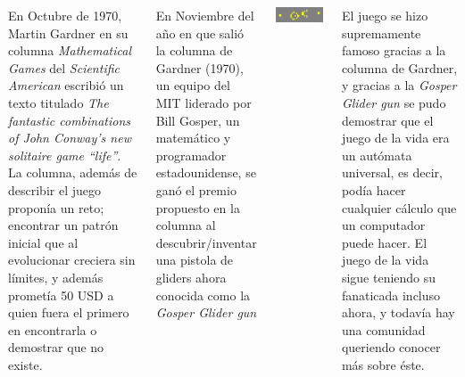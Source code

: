 \documentclass[20pt,margin=2.2cm,innermargin=-4.5in,blockverticalspace=-0.25in]{tikzposter}
\begin{document}
\begin{columns}
{        \vspace{5mm}
        En Octubre de 1970, Martin Gardner en su columna \textit{Mathematical Games} del \textit{Scientific American} \cite{Gardner1970} escribi\'o un texto titulado \textit{The fantastic combinations of John Conway's new solitaire game ``life''}. La columna, adem\'as de describir el juego propon\'ia un reto; encontrar un patr\'on inicial que al evolucionar creciera sin l\'imites, y adem\'as promet\'ia 50 USD a quien fuera el primero en encontrarla o demostrar que no existe.

        En Noviembre del a\~no en que sali\'o la columna de Gardner (1970), un equipo del MIT liderado por Bill Gosper, un matem\'atico y programador estadounidense, se gan\'o el premio propuesto en la columna al descubrir/inventar una pistola de gliders ahora conocida como la \textit{Gosper Glider gun}
        \vspace{7mm}

        \begin{minipage}[t]{\linewidth}
            \centering
            \includegraphics[width=.8\textwidth]{images/life-gosper-gun.png}
        \end{minipage}
        
        \vspace{5mm}
        El juego se hizo supremamente famoso gracias a la columna de Gardner, y gracias a la \textit{Gosper Glider gun} se pudo demostrar que el juego de la vida era un aut\'omata universal, es decir, pod\'ia hacer cualquier c\'alculo que un computador puede hacer. El juego de la vida sigue teniendo su fanaticada incluso ahora, y todav\'ia hay una comunidad queriendo conocer m\'as sobre \'este.
        \vspace{7mm}
    }

\end{columns}
\end{document}
